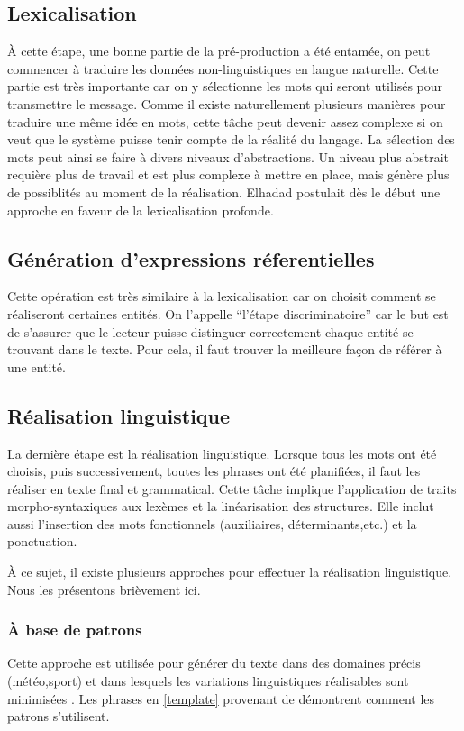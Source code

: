 \subsection{Lexicalisation}
À cette étape, une bonne partie de la pré-production a été entamée, on peut commencer à traduire les données non-linguistiques en langue naturelle. Cette partie est très importante car on y sélectionne les mots qui seront utilisés pour transmettre le message. Comme il existe naturellement plusieurs manières pour traduire une même idée en mots, cette tâche peut devenir assez complexe si on veut que le système puisse tenir compte de la réalité du langage. La sélection des mots peut ainsi se faire à divers niveaux d'abstractions. Un niveau plus abstrait requière plus de travail et est plus complexe à mettre en place, mais génère plus de possiblités au moment de la réalisation. Elhadad \cite{ElhadadFloatingConstraintsLexical1997} postulait dès le début une approche en faveur de la lexicalisation profonde.

\subsection{Génération d'expressions réferentielles}
Cette opération est très similaire à la lexicalisation car on choisit comment se réaliseront certaines entités. On l'appelle "`l'étape discriminatoire"' car le but est de s'assurer que le lecteur puisse distinguer correctement chaque entité se trouvant dans le texte. Pour cela, il faut trouver la meilleure façon de référer à une entité.

\subsection{Réalisation linguistique}
La dernière étape est la réalisation linguistique. Lorsque tous les mots ont été choisis, puis successivement, toutes les phrases ont été planifiées, il faut les réaliser en texte final et grammatical. Cette tâche implique l'application de traits morpho-syntaxiques aux lexèmes et la linéarisation des structures. Elle inclut aussi l'insertion des mots fonctionnels (auxiliaires, déterminants,etc.) et la ponctuation.

À ce sujet, il existe plusieurs approches pour effectuer la réalisation linguistique. Nous les présentons brièvement ici.

\subsubsection{À base de patrons}
Cette approche est utilisée pour générer du texte dans des domaines précis (météo,sport) et dans lesquels les variations linguistiques réalisables sont minimisées \citep{mcroy_channarukul_ali_2003}. Les phrases en \ref{template} provenant de \cite{gatt18} démontrent comment les patrons s'utilisent.

